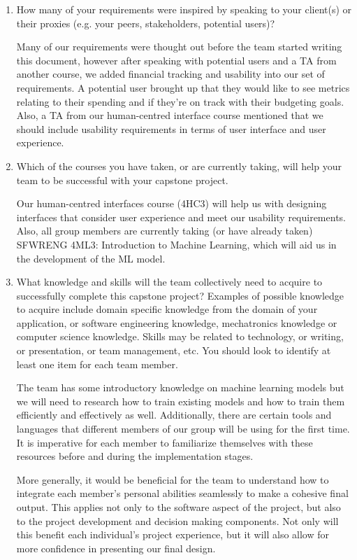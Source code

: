 \documentclass[12pt]{article}
\begin{document}
\begin{enumerate}
  \item How many of your requirements were inspired by speaking to your
  client(s) or their proxies (e.g. your peers, stakeholders, potential users)?

  Many of our requirements were thought out before the team started writing this document, however after speaking with potential users and a TA from another course, we added financial tracking and usability into our set of requirements. A potential user brought up that they would like to see metrics relating to their spending and if they’re on track with their budgeting goals. Also, a TA from our human-centred interface course mentioned that we should include usability requirements in terms of user interface and user experience.

  \item Which of the courses you have taken, or are currently taking, will help
  your team to be successful with your capstone project.

  Our human-centred interfaces course (4HC3) will help us with designing interfaces that consider user experience and meet our usability requirements. Also, all group members are currently taking (or have already taken) SFWRENG 4ML3: Introduction to Machine Learning, which will aid us in the development of the ML model. 

  \item What knowledge and skills will the team collectively need to acquire to
  successfully complete this capstone project?  Examples of possible knowledge
  to acquire include domain specific knowledge from the domain of your
  application, or software engineering knowledge, mechatronics knowledge or
  computer science knowledge.  Skills may be related to technology, or writing,
  or presentation, or team management, etc.  You should look to identify at
  least one item for each team member.

  The team has some introductory knowledge on machine learning models but we
  will need to research how to train existing models and how to train them
  efficiently and effectively as well. Additionally, there are certain tools and
  languages that different members of our group will be using for the first
  time. It is imperative for each member to familiarize themselves with these
  resources before and during the implementation stages.

  More generally, it would be beneficial for the team to understand how to
  integrate each member’s personal abilities seamlessly to make a cohesive final
  output. This applies not only to the software aspect of the project, but also
  to the project development and decision making components. Not only will this
  benefit each individual’s project experience, but it will also allow for more
  confidence in presenting our final design. 
  


\end{enumerate}
\end{document}
